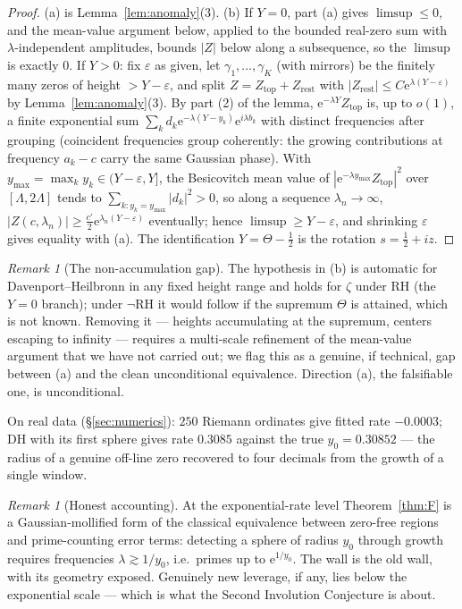 \documentclass[11pt]{amsart}
\theoremstyle{plain}
\theoremstyle{definition}
\theoremstyle{remark}
\newtheorem{remark}[theorem]{Remark}
\newcommand{\eE}{\mathrm{e}}
\begin{document}
\begin{proof}
(a) is Lemma~\ref{lem:anomaly}(3). (b) If $Y=0$, part (a) gives $\limsup\le0$, and the
mean-value argument below, applied to the bounded real-zero sum with $\lambda$-independent
amplitudes, bounds $|Z|$ below along a subsequence, so the $\limsup$ is exactly $0$. If $Y>0$:
fix $\varepsilon$ as given, let $\gamma_1,\dots,\gamma_K$ (with mirrors) be the finitely many
zeros of height $>Y-\varepsilon$, and split $Z=Z_{\mathrm{top}}+Z_{\mathrm{rest}}$ with
$|Z_{\mathrm{rest}}|\le C\eE^{\lambda(Y-\varepsilon)}$ by Lemma~\ref{lem:anomaly}(3). By part
(2) of the lemma, $\eE^{-\lambda Y}Z_{\mathrm{top}}$ is, up to $o(1)$, a finite exponential sum
$\sum_kd_k\eE^{-\lambda(Y-y_k)}\eE^{i\lambda b_k}$ with distinct frequencies after grouping
(coincident frequencies group coherently: the growing contributions at frequency $a_k-c$ carry
the same Gaussian phase). With $y_{\max}=\max_ky_k\in(Y-\varepsilon,Y]$, the Besicovitch mean
value of $|\eE^{-\lambda y_{\max}}Z_{\mathrm{top}}|^2$ over $[\Lambda,2\Lambda]$ tends to
$\sum_{k:y_k=y_{\max}}|d_k|^2>0$, so along a sequence $\lambda_n\to\infty$,
$|Z(c,\lambda_n)|\ge\tfrac{c'}2\eE^{\lambda_n(Y-\varepsilon)}$ eventually; hence
$\limsup\ge Y-\varepsilon$, and shrinking $\varepsilon$ gives equality with (a). The
identification $Y=\Theta-\tfrac12$ is the rotation $s=\tfrac12+iz$.
\end{proof}

\begin{remark}[The non-accumulation gap]\label{rem:accumulation}
The hypothesis in (b) is automatic for Davenport--Heilbronn in any fixed height range and holds
for $\zeta$ under RH (the $Y=0$ branch); under $\neg$RH it would follow if the supremum $\Theta$
is attained, which is not known. Removing it --- heights accumulating at the supremum, centers
escaping to infinity --- requires a multi-scale refinement of the mean-value argument that we
have not carried out; we flag this as a genuine, if technical, gap between (a) and the clean
unconditional equivalence. Direction (a), the falsifiable one, is unconditional.
\end{remark}

On real data (\S\ref{sec:numerics}): $250$ Riemann ordinates give fitted rate $-0.0003$; DH with
its first sphere gives rate $0.3085$ against the true $y_0=0.30852$ --- the radius of a genuine
off-line zero recovered to four decimals from the growth of a single window.

\begin{remark}[Honest accounting]\label{rem:honest}
At the exponential-rate level Theorem~\ref{thm:F} is a Gaussian-mollified form of the classical
equivalence between zero-free regions and prime-counting error terms: detecting a sphere of radius
$y_0$ through growth requires frequencies $\lambda\gtrsim1/y_0$, i.e.\ primes up to
$\eE^{1/y_0}$. The wall is the old wall, with its geometry exposed. Genuinely new leverage, if
any, lies below the exponential scale --- which is what the Second Involution Conjecture is about.
\end{remark}
\end{document}
